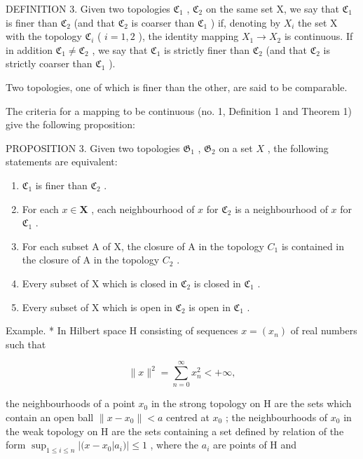 DEFINITION 3. Given two topologies \(\mathfrak{C}_1\) , \(\mathfrak{C}_2\) on the same set X, we say that \(\mathfrak{C}_1\) is finer than \(\mathfrak{C}_2\) (and that \(\mathfrak{C}_2\) is coarser than \(\mathfrak{C}_1\) ) if, denoting by \(X_i\) the set X with the topology \(\mathfrak{C}_i\) ( \(i = 1, 2\) ), the identity mapping \(X_1 \to X_2\) is continuous. If in addition \(\mathfrak{C}_1 \neq \mathfrak{C}_2\) , we say that \(\mathfrak{C}_1\) is strictly finer than \(\mathfrak{C}_2\) (and that \(\mathfrak{C}_2\) is strictly coarser than \(\mathfrak{C}_1\) ).

Two topologies, one of which is finer than the other, are said to be comparable.

The criteria for a mapping to be continuous (no. 1, Definition 1 and Theorem 1) give the following proposition:

PROPOSITION 3. Given two topologies \(\mathfrak{G}_1\) , \(\mathfrak{G}_2\) on a set \(X\) , the following statements are equivalent:

\begin{enumerate}
\def\labelenumi{\alph{enumi})}
\item
  \(\mathfrak{C}_1\) is finer than \(\mathfrak{C}_2\) .
\item
  For each \(x \in \mathbf{X}\) , each neighbourhood of \(x\) for \(\mathfrak{C}_2\) is a neighbourhood of \(x\) for \(\mathfrak{C}_1\) .
\item
  For each subset A of X, the closure of A in the topology \(C_{1}\) is contained in the closure of A in the topology \(C_{2}\) .
\item
  Every subset of X which is closed in \(\mathfrak{C}_{2}\) is closed in \(\mathfrak{C}_{1}\) .
\item
  Every subset of X which is open in \(\mathfrak{C}_{2}\) is open in \(\mathfrak{C}_{1}\) .
\end{enumerate}

Example. * In Hilbert space H consisting of sequences \(x = (x_n)\) of real numbers such that

\[
\| x \| ^ {2} = \sum_ {n = 0} ^ {\infty} x _ {n} ^ {2} <   + \infty ,
\]

the neighbourhoods of a point \(x_0\) in the strong topology on H are the sets which contain an open ball \(\|x - x_0\| < a\) centred at \(x_0\) ; the neighbourhoods of \(x_0\) in the weak topology on H are the sets containing a set defined by relation of the form \(\sup_{1 \leqslant i \leqslant n} |(x - x_0|a_i)| \leqslant 1\) , where the \(a_i\) are points of H and

